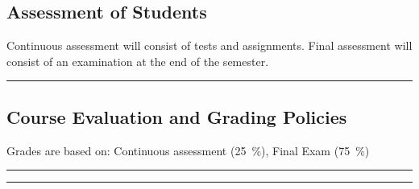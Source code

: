 \subsection*{Assessment of Students}
\begin{outline}
    \1 Continuous assessment will consist of tests and assignments.
    \1 Final assessment will consist of an examination at the end of the semester.
\end{outline}
\vspace{2ex}\hrule\vspace{2ex}

\subsection*{Course Evaluation and Grading Policies}
Grades are based on:
Continuous assessment (\qty{25}{\percent}),
Final Exam (\qty{75}{\percent})



\vspace{2ex}\hrule
\vspace{2ex}\hrule\vspace{2ex}